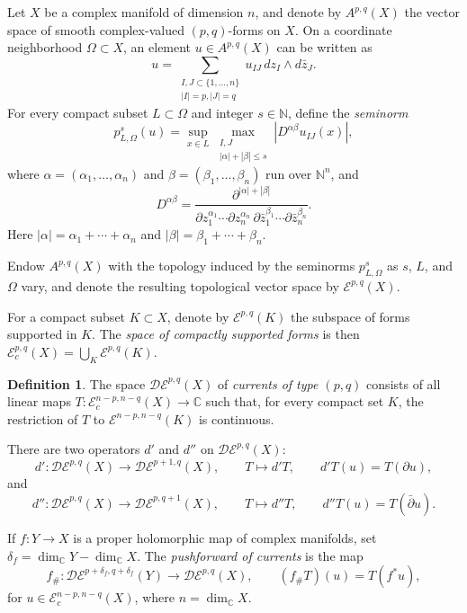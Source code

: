 \documentclass[11pt]{amsart}
\numberwithin{equation}{section}
\theoremstyle{plain}
\theoremstyle{definition}
\newtheorem{De}[thm]{Definition}
\begin{document}
Let $X$ be a complex manifold of dimension $n$, and denote by $A^{p,q}(X)$ the
vector space of smooth complex-valued $(p,q)$-forms on $X$.  On a coordinate
neighborhood $\Omega\subset X$, an element $u\in A^{p,q}(X)$ can be written as
\[
u = \sum_{\substack{I,J \subset \{1,\dots,n\} \\ |I| = p, |J| = q}}
u_{IJ} \, dz_I\wedge d\bar{z}_J.
\]
For every compact subset $L\subset\Omega$ and integer $s\in\mathbb N$, define
the \emph{seminorm}
\[
p_{L,\Omega}^s(u) = \sup_{x\in L} \max_{\substack{I,J \\ |\alpha|+ |\beta|\le s}} \left|D^{\alpha\beta}u_{IJ}(x)\right|,
\]
where $\alpha=(\alpha_1,\dots,\alpha_n)$ and
$\beta=(\beta_1,\dots,\beta_n)$ run over $\mathbb N^n$, and
\[
D^{\alpha\beta} = \frac{\partial^{|\alpha|+|\beta|}}{\partial z_1^{\alpha_1}\cdots \partial z_n^{\alpha_n}\,\partial\bar z_1^{\beta_1}\cdots \partial\bar z_n^{\beta_n}}.
\]
Here $|\alpha|=\alpha_1+\cdots+\alpha_n$ and
$|\beta|=\beta_1+\cdots+\beta_n$.

Endow $A^{p,q}(X)$ with the topology induced by the seminorms
$p_{L,\Omega}^s$ as $s$, $L$, and $\Omega$ vary, and denote the resulting
topological vector space by $\mathcal E^{p,q}(X)$.

For a compact subset $K\subset X$, denote by $\mathcal E^{p,q}(K)$ the
subspace of forms supported in $K$.  The \emph{space of compactly supported forms}
is then
$\mathcal E_c^{p,q}(X)=\bigcup_K\mathcal E^{p,q}(K)$.
\begin{De}
The space $\mathcal{DE}^{p,q}(X)$ of \emph{currents of type $(p,q)$} consists of
all linear maps
$T:\mathcal{E}_c^{n-p,n-q}(X)\longrightarrow\mathbb C$ such that, for every
compact set $K$, the restriction of $T$ to
$\mathcal{E}^{n-p,n-q}(K)$ is continuous.
\end{De}

There are two operators $d'$ and $d''$ on $\mathcal{DE}^{p,q}(X)$:
\[
d':\mathcal{DE}^{p,q}(X)\longrightarrow\mathcal{DE}^{p+1,q}(X),
\qquad T\longmapsto d'T,\qquad d'T(u)=T(\partial u),
\]
and
\[
d'':\mathcal{DE}^{p,q}(X)\longrightarrow\mathcal{DE}^{p,q+1}(X),
\qquad T\longmapsto d''T,\qquad d''T(u)=T(\bar\partial u).
\]

If $f:Y\longrightarrow X$ is a proper holomorphic map of complex manifolds,
set $\delta_f=\dim_{\mathbb C}Y-\dim_{\mathbb C}X$.  The \emph{pushforward of
currents} is the map
\[
f_\#: \mathcal{DE}^{p+\delta_f,q+\delta_f}(Y)
\longrightarrow\mathcal{DE}^{p,q}(X),
\qquad (f_\#T)(u)=T(f^*u),
\]
for $u\in\mathcal E_c^{n-p,n-q}(X)$, where $n=\dim_{\mathbb C}X$.
\end{document}
